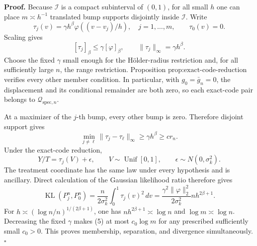 \textbf{Proof.}
Because \(\mathcal I\) is a compact subinterval of \((0,1)\), for all small \(h\) one can place \(m\asymp h^{-1}\) translated bump supports disjointly inside \(\mathcal I\). Write
\[
 \tau_j(v)=\gamma h^\beta\varphi((v-v_j)/h),
 \quad j=1,\ldots,m,
 \qquad \tau_0(v)=0. \tag{1}
\]
Scaling gives
\[
 [\tau_j]_\beta\le\gamma[\varphi]_\beta,
 \qquad \|\tau_j\|_\infty=\gamma h^\beta. \tag{2}
\]
Choose the fixed \(\gamma\) small enough for the H\"older-radius restriction and, for all sufficiently large \(n\), the range restriction. Proposition \(\text{prop:exact-code-reduction}\) verifies every other member condition. In particular, with \(g_0=\bar g_n=0\), the displacement and its conditional remainder are both zero, so each exact-code pair belongs to \(\mathcal Q_{\mathrm{spec},n}\).

At a maximizer of the \(j\)-th bump, every other bump is zero. Therefore disjoint support gives
\[
 \min_{j\ne\ell}\|\tau_j-\tau_\ell\|_\infty
 \ge\gamma h^\beta\ge c r_n. \tag{3}
\]
Under the exact-code reduction,
\[
 Y/T=\tau_j(V)+\epsilon,
 \qquad V\sim\operatorname{Unif}[0,1],
 \qquad \epsilon\sim N(0,\sigma_k^2). \tag{4}
\]
The treatment coordinate has the same law under every hypothesis and is ancillary. Direct calculation of the Gaussian likelihood ratio therefore gives
\[
 \operatorname{KL}(P_j^n,P_0^n)
 =\frac{n}{2\sigma_k^2}\int_0^1\tau_j(v)^2\,dv
 =\frac{\gamma^2\|\varphi\|_2^2}{2\sigma_k^2}nh^{2\beta+1}. \tag{5}
\]
For \(h\asymp(\log n/n)^{1/(2\beta+1)}\), one has \(nh^{2\beta+1}\asymp\log n\) and \(\log m\asymp\log n\). Decreasing the fixed \(\gamma\) makes (5) at most \(c_0\log m\) for any prescribed sufficiently small \(c_0>0\). This proves membership, separation, and divergence simultaneously. \(\square\)